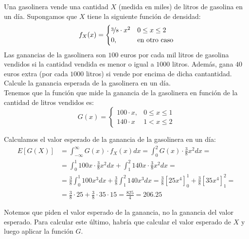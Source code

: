 \begin{ejercicio}
    Una gasolinera vende una cantidad $X$ (medida en miles) de litros de gasolina en un día. Supongamos que $X$ tiene la siguiente función de densidad:
    \begin{equation*}
        f_X(x) = \begin{cases}
            \nicefrac{3}{8}\cdot x^2 & 0\leq x\leq 2 \\
            0, & \text{en otro caso}
        \end{cases}
    \end{equation*}
    Las ganancias de la gasolinera son $100$ euros por cada mil litros de gasolina vendidos si la cantidad vendida es menor o igual a $1000$ litros. Además, gana $40$ euros extra (por cada $1000$ litros) si vende por encima de dicha cantantidad.
    Calcule la ganancia esperada de la gasolinera en un día.\\

    Tenemos que la función que mide la ganancia de la gasolinera en función de la cantidad de litros vendidos es:
    \begin{equation*}
        G(x) = \begin{cases}
            100\cdot x, & 0\leq x\leq 1 \\
            140\cdot x  & 1 < x\leq 2
        \end{cases}
    \end{equation*}

    Calculamos el valor esperado de la ganancia de la gasolinera en un día:
    \begin{align*}
        E[G(X)] &= \int_{-\infty}^{\infty}G(x)\cdot f_X(x)dx = \int_{0}^{2}G(x)\cdot \frac{3}{8}x^2dx =\\&= \int_{0}^{1}100x\cdot \frac{3}{8}x^2dx + \int_{1}^{2}140x\cdot \frac{3}{8}x^2dx =\\
        &= \frac{3}{8}\int_{0}^{1}100x^3dx + \frac{3}{8}\int_{1}^{2}140x^3dx = \frac{3}{8}\left[25x^4\right]_{0}^{1} + \frac{3}{8}\left[35x^4\right]_{1}^{2} =\\
        &= \frac{3}{8}\cdot 25 + \frac{3}{8}\cdot 35\cdot 15 = \frac{825}{4} = 206.25
    \end{align*}

    \begin{observacion}
        Notemos que piden el valor esperado de la ganancia, no la ganancia del valor esperado. Para calcular este último, habría que calcular el valor esperado de $X$ y luego aplicar la función $G$.


\end{observacion}
\end{ejercicio}
